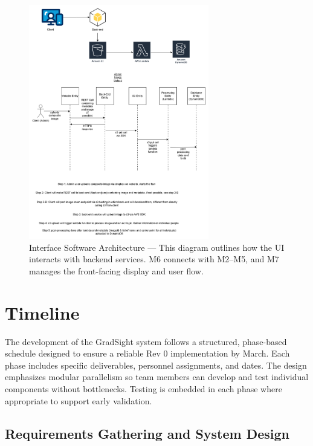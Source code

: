\documentclass[12pt, titlepage]{article}
\begin{document}
\begin{figure}[H]
\centering
\includegraphics[width=0.7\textwidth]{ocr-arch_1.png}
\caption{Interface Software Architecture — This diagram outlines how the UI interacts with backend services. M6 connects with M2–M5, and M7 manages the front-facing display and user flow.}
\label{FigUIArch}
\end{figure}


\section{Timeline}
\label{SecTimeline}

The development of the GradSight system follows a structured, phase-based schedule designed to ensure a reliable Rev 0 implementation by March. Each phase includes specific deliverables, personnel assignments, and dates. The design emphasizes modular parallelism so team members can develop and test individual components without bottlenecks. Testing is embedded in each phase where appropriate to support early validation.

\subsection{Requirements Gathering and System Design}
\label{SecReq}
\end{document}

